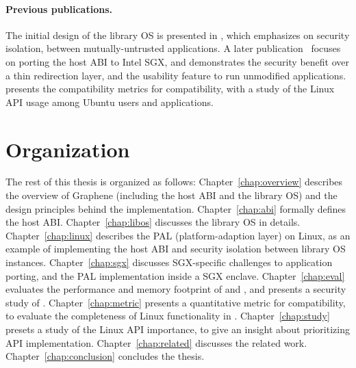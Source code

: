 \paragraph{Previous publications.}
The initial design of the \graphene{} library OS is presented in \cite{tsai14graphene}, which emphasizes on security isolation, between mutually-untrusted applications.
A later publication~\cite{tsai17graphene-sgx} focuses on porting the host ABI
to Intel SGX, and demonstrates the security benefit 
over a thin redirection layer, and the usability feature to run unmodified applications.
\cite{tsai16apistudy} presents the compatibility metrics for compatibility,
with a study of the Linux API usage among Ubuntu users and applications.

\section{Organization}

The rest of this thesis is organized as follows:
Chapter~\ref{chap:overview} describes the overview of Graphene (including the host ABI and the library OS) and the design principles behind the implementation.
Chapter~\ref{chap:abi} formally defines the host ABI.
Chapter~\ref{chap:libos} discusses the library OS in details.
Chapter~\ref{chap:linux} describes the PAL (platform-adaption layer) on Linux, as an example of implementing the host ABI and security isolation between library OS instances.
Chapter~\ref{chap:sgx} discusses SGX-specific challenges to application porting, and the PAL implementation inside a SGX enclave.
Chapter~\ref{chap:eval} evaluates the performance and memory footprint of \graphene{} and \graphenesgx{},
and presents a security study of \graphene{}.
Chapter~\ref{chap:metric} presents a quantitative metric for compatibility,
to evaluate the completeness of Linux functionality in \graphene{}.
Chapter~\ref{chap:study} presets a study of the Linux API importance, to give an insight about prioritizing API implementation.
Chapter~\ref{chap:related} discusses the related work.
Chapter~\ref{chap:conclusion} concludes the thesis.
